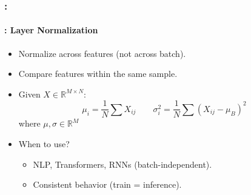 \documentclass[xcolor=table]{beamer}
\begin{document}
\begin{frame}
	\frametitle{\insertshortsubtitle: \insertsection}
	\framesubtitle{\insertsubsection: Layer Normalization}
	
	\begin{itemize}
		\item Normalize across features (not across batch).
		\item Compare features within the same sample.
		\item Given $X \in \mathbb{R}^{M\times N}$:
		\[ \mu_i = \frac{1}{N} \sum X_{ij} \quad\quad \sigma_i^2 = \frac{1}{N} \sum (X_{ij} - \mu_B)^2\]
		where $\mu, \sigma \in \mathbb{R}^M$
		\item When to use?
		\begin{itemize}
			\item NLP, Transformers, RNNs (batch-independent).
			\item Consistent behavior (train = inference).
		\end{itemize}
	\end{itemize}
	
\end{frame}
\end{document}
